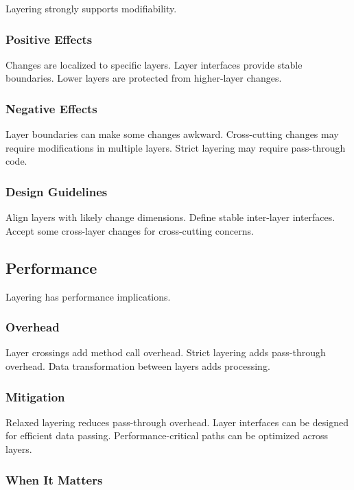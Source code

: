 \documentclass[11pt]{article}
\begin{document}
Layering strongly supports modifiability.

\subsubsection{Positive Effects}

Changes are localized to specific layers. Layer interfaces provide stable boundaries. Lower layers are protected from higher-layer changes.

\subsubsection{Negative Effects}

Layer boundaries can make some changes awkward. Cross-cutting changes may require modifications in multiple layers. Strict layering may require pass-through code.

\subsubsection{Design Guidelines}

Align layers with likely change dimensions. Define stable inter-layer interfaces. Accept some cross-layer changes for cross-cutting concerns.

\subsection{Performance}

Layering has performance implications.

\subsubsection{Overhead}

Layer crossings add method call overhead. Strict layering adds pass-through overhead. Data transformation between layers adds processing.

\subsubsection{Mitigation}

Relaxed layering reduces pass-through overhead. Layer interfaces can be designed for efficient data passing. Performance-critical paths can be optimized across layers.

\subsubsection{When It Matters}
\end{document}
